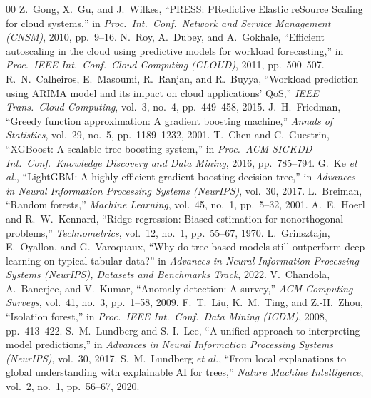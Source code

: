 \documentclass[conference]{IEEEtran}
\begin{document}
\begin{thebibliography}{00}
 Z.~Gong, X.~Gu, and J.~Wilkes, ``PRESS: PRedictive
Elastic reSource Scaling for cloud systems,'' in \emph{Proc.\ Int.\ Conf.\
Network and Service Management (CNSM)}, 2010, pp.~9--16.
 N.~Roy, A.~Dubey, and A.~Gokhale, ``Efficient
autoscaling in the cloud using predictive models for workload forecasting,'' in
\emph{Proc.\ IEEE Int.\ Conf.\ Cloud Computing (CLOUD)}, 2011, pp.~500--507.
\bibitem{calheiros2015arima} R.~N.~Calheiros, E.~Masoumi, R.~Ranjan, and
R.~Buyya, ``Workload prediction using ARIMA model and its impact on cloud
applications' QoS,'' \emph{IEEE Trans.\ Cloud Computing}, vol.~3, no.~4,
pp.~449--458, 2015.
 J.~H.~Friedman, ``Greedy function approximation: A
gradient boosting machine,'' \emph{Annals of Statistics}, vol.~29, no.~5,
pp.~1189--1232, 2001.
 T.~Chen and C.~Guestrin, ``XGBoost: A scalable tree
boosting system,'' in \emph{Proc.\ ACM SIGKDD Int.\ Conf.\ Knowledge Discovery
and Data Mining}, 2016, pp.~785--794.
 G.~Ke \emph{et al.}, ``LightGBM: A highly efficient
gradient boosting decision tree,'' in \emph{Advances in Neural Information
Processing Systems (NeurIPS)}, vol.~30, 2017.
 L.~Breiman, ``Random forests,'' \emph{Machine
Learning}, vol.~45, no.~1, pp.~5--32, 2001.
 A.~E.~Hoerl and R.~W.~Kennard, ``Ridge regression:
Biased estimation for nonorthogonal problems,'' \emph{Technometrics}, vol.~12,
no.~1, pp.~55--67, 1970.
 L.~Grinsztajn, E.~Oyallon, and G.~Varoquaux,
``Why do tree-based models still outperform deep learning on typical tabular
data?'' in \emph{Advances in Neural Information Processing Systems (NeurIPS),
Datasets and Benchmarks Track}, 2022.
 V.~Chandola, A.~Banerjee, and V.~Kumar,
``Anomaly detection: A survey,'' \emph{ACM Computing Surveys}, vol.~41, no.~3,
pp.~1--58, 2009.
 F.~T.~Liu, K.~M.~Ting, and Z.-H.~Zhou, ``Isolation
forest,'' in \emph{Proc.\ IEEE Int.\ Conf.\ Data Mining (ICDM)}, 2008,
pp.~413--422.
 S.~M.~Lundberg and S.-I.~Lee, ``A unified approach
to interpreting model predictions,'' in \emph{Advances in Neural Information
Processing Systems (NeurIPS)}, vol.~30, 2017.
 S.~M.~Lundberg \emph{et al.}, ``From local
explanations to global understanding with explainable AI for trees,''
\emph{Nature Machine Intelligence}, vol.~2, no.~1, pp.~56--67, 2020.

\end{thebibliography}
\end{document}
